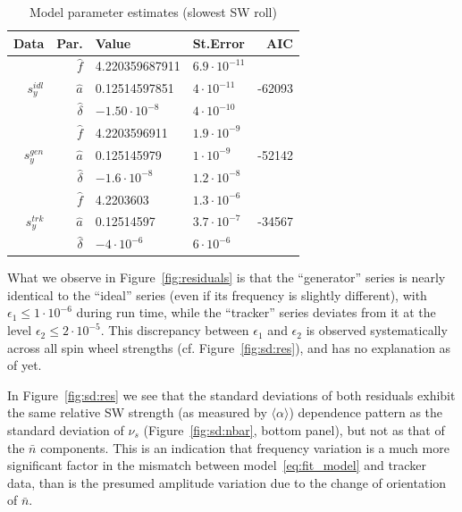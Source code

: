 \documentclass[a4paper]{jacow}
\newcommand{\avg}[1]{\langle {#1} \rangle}
\newcommand{\nbar}{\bar n}
\begin{document}
\begin{table}[h]
  \caption{Model parameter estimates (slowest SW roll)\label{tbl:param_estimates}}
  \begin{tabular}{r|rllr}
    \toprule
    Data & Par. & Value & St.Error & AIC \\
    \midrule
    \multirow{3}{*}{$s_y^{idl}$}
    & $\hat f$ & 4.220359687911 & $6.9\cdot 10^{-11}$ & \multirow{3}{*}{-62093} \\
    & $\hat a$ & 0.12514597851 & $4\cdot 10^{-11}$ & \\
    & $\hat\delta$ & $-1.50\cdot 10^{-8}$ & $4\cdot 10^{-10}$ &\\
    \hline
    \multirow{3}{*}{$s_y^{gen}$}
    & $\hat f$ & 4.2203596911 & $1.9\cdot 10^{-9}$ & \multirow{3}{*}{-52142} \\
    & $\hat a$ & 0.125145979 & $1\cdot 10^{-9}$ & \\
    & $\hat\delta$ & $-1.6\cdot 10^{-8}$ & $1.2\cdot 10^{-8}$ &\\
    \hline
    \multirow{3}{*}{$s_y^{trk}$}
    & $\hat f$ & 4.2203603 & $1.3\cdot 10^{-6}$ & \multirow{3}{*}{-34567} \\
    & $\hat a$ & 0.12514597 & $3.7\cdot 10^{-7}$ & \\
    & $\hat\delta$ & $-4\cdot 10^{-6}$ & $6\cdot 10^{-6}$ &\\
    \bottomrule
  \end{tabular}
\end{table}

What we observe in Figure~\ref{fig:residuals} is that the ``generator'' series is nearly identical
to the ``ideal'' series (even if its frequency is slightly different), with $\epsilon_1 \le 1\cdot10^{-6}$
during run time,
while the ``tracker'' series deviates from it at the level
$\epsilon_2 \le 2\cdot 10^{-5}$. This discrepancy between $\epsilon_1$ and $\epsilon_2$ is observed
systematically across all spin wheel strengths (cf. Figure~\ref{fig:sd:res}), and has no explanation as of yet.

In Figure~\ref{fig:sd:res} we see that the standard deviations of both residuals exhibit the same
relative SW strength (as measured by $\avg{\alpha}$) dependence pattern as
the standard deviation of $\nu_s$ (Figure~\ref{fig:sd:nbar}, bottom panel), but not as that of
the $\nbar$ components. This is an indication that frequency variation is a much more significant factor
in the mismatch between model~\eqref{eq:fit_model} and tracker data, than is the presumed amplitude variation
due to the change of orientation of $\nbar$.
\end{document}

